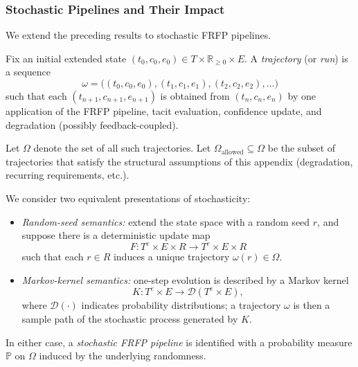 \subsubsection{Stochastic Pipelines and Their Impact}
\label{sec:B15-stochastic}

We extend the preceding results to stochastic FRFP pipelines.


\begin{definition}[Trajectory]
Fix an initial extended state \((t_0,c_0,e_0)\in T\times
\mathbb{R}_{\ge 0}\times E\). A \emph{trajectory} (or \emph{run}) is a
sequence
\[
\omega
 =
\bigl( (t_0,c_0,e_0), (t_1,c_1,e_1), (t_2,c_2,e_2), \dots \bigr)
\]
such that each \((t_{n+1},c_{n+1},e_{n+1})\) is obtained from
\((t_n,c_n,e_n)\) by one application of the FRFP pipeline, tacit
evaluation, confidence update, and degradation (possibly
feedback-coupled).
\end{definition}

Let \(\Omega\) denote the set of all such trajectories. Let
\(\Omega_{\mathrm{allowed}}\subseteq \Omega\) be the subset of
trajectories that satisfy the structural assumptions of this appendix
(degradation, recurring requirements, etc.).

We consider two equivalent presentations of stochasticity:
\begin{itemize}
  \item \emph{Random-seed semantics:} extend the state space with a
        random seed \(r\), and suppose there is a deterministic update
        map
        \[
        F: T^e\times E \times R \to T^e \times E \times R
        \]
        such that each \(r\in R\) induces a unique trajectory
        \(\omega(r)\in\Omega\).
  \item \emph{Markov-kernel semantics:} one-step evolution is described
        by a Markov kernel
        \[
        K : T^e\times E \to \mathcal{D}(T^e\times E),
        \]
        where \(\mathcal{D}(\cdot)\) indicates probability
        distributions; a trajectory \(\omega\) is then a sample path of
        the stochastic process generated by \(K\).
\end{itemize}

In either case, a \emph{stochastic FRFP pipeline} is identified with a
probability measure \(\mathbb{P}\) on \(\Omega\) induced by the
underlying randomness.


